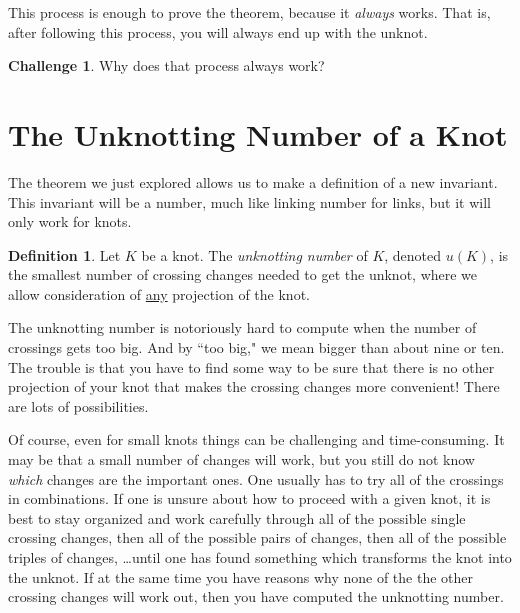 \documentclass[12pt,letterpaper]{article}
\theoremstyle{definition}
\newtheorem*{challenge}{Challenge}
\newtheorem*{definition}{Definition}
\begin{document}
This process is enough to prove the theorem, because it \emph{always} works.
That is, after following this process, you will always end up with the unknot.

\begin{challenge}
Why does that process always work?
\end{challenge}


\section*{The Unknotting Number of a Knot}

The theorem we just explored allows us to make a definition of a new invariant. This invariant will be a number, much like linking number for links, but it will only work for knots.

\begin{definition}
Let $K$ be a knot.
The \emph{unknotting number} of $K$, denoted $u(K)$, is the smallest number of crossing changes needed to get the unknot, where we allow consideration of \underline{any} projection of the knot.
\end{definition}

The unknotting number is notoriously hard to compute when the number of crossings gets too big. 
And by ``too big," we mean bigger than about nine or ten. 
The trouble is that you have to find some way to be sure that there is no other projection of your knot that makes the crossing changes more convenient! 
There are lots of possibilities.

Of course, even for small knots things can be challenging and time-consuming. 
It may be that a small number of changes will work, but you still do not know \emph{which} changes are the important ones.
One usually has to try all of the crossings in combinations.
If one is unsure about how to proceed with a given knot, it is best to stay organized and work carefully through all of the possible single crossing changes, then all of the possible pairs of changes, then all of the possible triples of changes, \dots until one has found something which transforms the knot into the unknot. 
If at the same time you have reasons why none of the the other crossing changes will work out, then you have computed the unknotting number.

\clearpage
\end{document}
